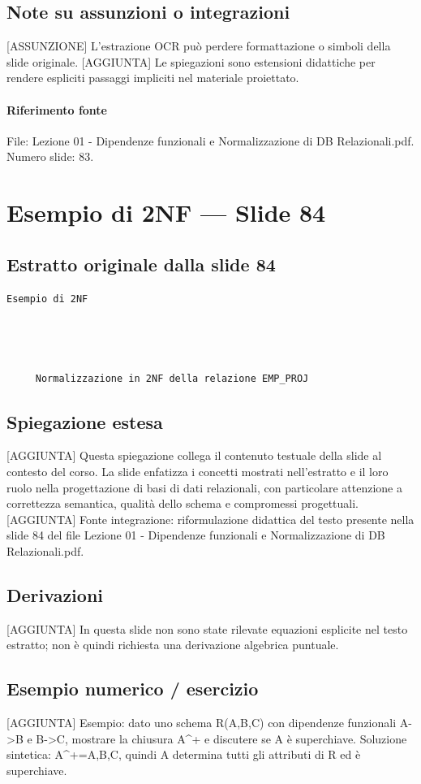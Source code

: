 \documentclass[11pt]{article}
\begin{document}
\subsection*{Note su assunzioni o integrazioni}
[ASSUNZIONE] L'estrazione OCR può perdere formattazione o simboli della slide originale.
[AGGIUNTA] Le spiegazioni sono estensioni didattiche per rendere espliciti passaggi impliciti nel materiale proiettato.
\paragraph{Riferimento fonte} File: Lezione 01 - Dipendenze funzionali e Normalizzazione di DB Relazionali.pdf. Numero slide: 83.
\section{Esempio di 2NF --- Slide 84}
\subsection*{Estratto originale dalla slide 84}
\begin{lstlisting}
Esempio di 2NF




     Normalizzazione in 2NF della relazione EMP_PROJ
\end{lstlisting}
\subsection*{Spiegazione estesa}
[AGGIUNTA] Questa spiegazione collega il contenuto testuale della slide al contesto del corso. La slide enfatizza i concetti mostrati nell'estratto e il loro ruolo nella progettazione di basi di dati relazionali, con particolare attenzione a correttezza semantica, qualità dello schema e compromessi progettuali.
[AGGIUNTA] Fonte integrazione: riformulazione didattica del testo presente nella slide 84 del file Lezione 01 - Dipendenze funzionali e Normalizzazione di DB Relazionali.pdf.
\subsection*{Derivazioni}
[AGGIUNTA] In questa slide non sono state rilevate equazioni esplicite nel testo estratto; non è quindi richiesta una derivazione algebrica puntuale.
\subsection*{Esempio numerico / esercizio}
[AGGIUNTA] Esempio: dato uno schema R(A,B,C) con dipendenze funzionali A->B e B->C, mostrare la chiusura A^+ e discutere se A è superchiave. Soluzione sintetica: A^+={A,B,C}, quindi A determina tutti gli attributi di R ed è superchiave.
\end{document}
